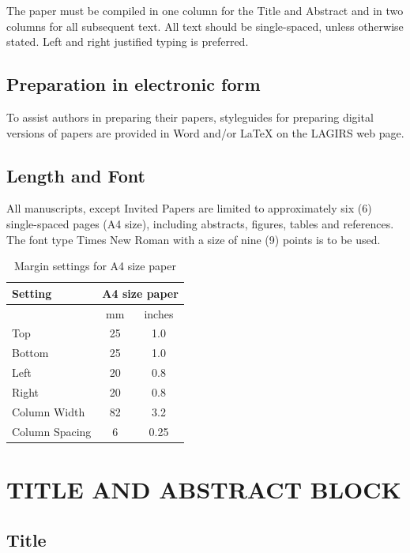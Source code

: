 \documentclass{isprs} %
\begin{document}
The paper must be compiled in one column for the Title and Abstract and in two columns for all subsequent text. 
All text should be single-spaced, unless otherwise stated. Left and right justified typing is preferred.


\subsection{Preparation in electronic form}\label{sec:Preparation in electronic form}

To assist authors in preparing their papers, styleguides for preparing digital versions of papers are 
provided in Word and/or LaTeX on the LAGIRS web page.



\subsection{Length and Font}\label{sec:Length and Font}

All manuscripts, except Invited Papers are limited to approximately six (6) single-spaced 
pages (A4 size), including abstracts, figures, tables and references. The font type Times New Roman with a size of nine (9) points is to be used.

\begin{table}[h]
	\centering
		\begin{tabular}{|l|c|c|}\hline
			Setting&\multicolumn{2}{c|}{A4 size paper}\\\hline
			  &mm&inches\\
			 Top&25&1.0\\
			 Bottom&25&1.0\\
			 Left&20&0.8\\
			 Right&20&0.8\\
			 Column Width&82&3.2\\
			 Column Spacing&6&0.25\\\hline
		\end{tabular}
	\caption{Margin settings for A4 size paper}
\label{tab:Margin_settings}
\end{table}

\section{TITLE AND ABSTRACT BLOCK}\label{sec:TITLE AND ABSTRACT BLOCK}

\subsection{Title}\label{sec:Title}
\end{document}
